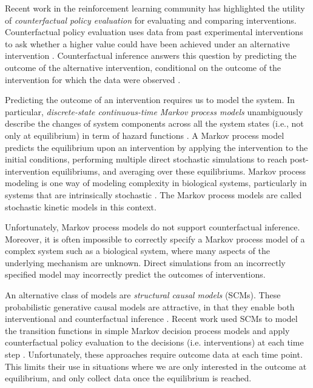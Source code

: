 \documentclass{article}
\begin{document}
Recent work in the reinforcement learning community has highlighted the utility of {\it counterfactual policy evaluation} for evaluating and comparing interventions. Counterfactual policy evaluation uses data from past experimental interventions to ask whether a higher value could have been achieved under an alternative intervention \cite{bottou2013counterfactual, joachims2016counterfactual, 2018arXiv181106272B, oberst2019counterfactual}. Counterfactual inference answers this question by predicting the outcome of the alternative intervention, conditional on the outcome of the intervention for which the data were observed  \cite{bottou2013counterfactual, pearl2011algorithmization}.


Predicting the outcome of an intervention requires us to model the system. In particular, {\it discrete-state continuous-time Markov process models} unambiguously describe the changes of system components across all the system states (i.e., not only at equilibrium) in term of hazard functions \cite{Ecological, wilkinson2006stochastic}. A Markov process model predicts the equilibrium upon an intervention by applying the intervention to the initial conditions, performing multiple direct stochastic simulations to reach post-intervention equilibriums, and averaging over these equilibriums. Markov process modeling is one way of modeling complexity in biological systems, particularly in systems that are intrinsically stochastic \cite{alon2006introduction}. The Markov process models are called stochastic kinetic models in this context. 

Unfortunately, Markov process models do not support counterfactual inference. Moreover, it is often impossible to correctly specify a Markov process model of a complex system such as a biological system, where many aspects of the underlying mechanism are unknown. Direct simulations from an incorrectly specified model may incorrectly predict the outcomes of interventions. 

An alternative class of models are \emph{structural causal models} (SCMs). These probabilistic generative causal models are attractive, in that they enable both interventional and counterfactual inference \cite{pearl2009causal}. Recent work used SCMs to model the transition functions in simple Markov decision process models and apply counterfactual policy evaluation to the decisions (i.e. interventions) at each time step \cite{2018arXiv181106272B, oberst2019counterfactual}. Unfortunately, these approaches require outcome data at each time point. This limits their use in situations where we are only interested in the outcome at equilibrium, and only collect data once the equilibrium is reached. 
\end{document}
